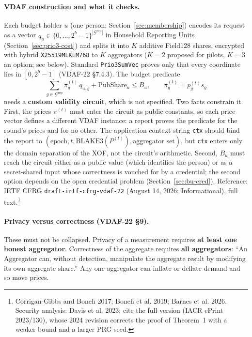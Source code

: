 \documentclass[10pt,twoside,openany]{book}
\theoremstyle{dpepstyle}
\begin{document}
\paragraph{VDAF construction and what it checks.}
Each budget holder $u$ (one person; Section~\ref{sec:membership}) encodes its request as a vector $q_u \in \{0,\dots,2^{b}-1\}^{|\mathcal{G}^{\text{rep}}|}$ in Household Reporting Units (Section~\ref{sec:prio3-cost}) and splits it into $K$ additive Field128 shares, encrypted with hybrid \texttt{X25519MLKEM768} to $K$ aggregators ($K=2$ proposed for pilots, $K=3$ an option; see below). Standard \texttt{Prio3SumVec} proves only that every coordinate lies in $[0, 2^b-1]$ (VDAF-22 \S 7.4.3). The budget predicate
\begin{equation}
  \sum_{g \in \mathcal{G}^{\text{rep}}} \pi_g^{(t)}\, q_{u,g} + \text{PubShare}_u \le B_u, \qquad \pi_g^{(t)} = p_g^{(t)} s_g \label{eq:budget-circuit}
\end{equation}
needs a \textbf{custom validity circuit}, which is not specified. Two facts constrain it. First, the prices $\pi^{(t)}$ must enter the circuit as public constants, so each price vector defines a different VDAF instance: a report proves the predicate for the round's prices and for no other. The application context string \texttt{ctx} should bind the report to $(\text{epoch}, t, \text{BLAKE3}(P^{(t)}), \text{aggregator set})$, but \texttt{ctx} enters only the domain separation of the XOF, not the circuit's arithmetic. Second, $B_u$ must reach the circuit either as a public value (which identifies the person) or as a secret-shared input whose correctness is vouched for by a credential; the second option depends on the open credential problem (Section~\ref{sec:bu-cred}). Reference: IETF CFRG \texttt{draft-irtf-cfrg-vdaf-22} (August 14, 2026; Informational), full text.\footnote{Corrigan-Gibbs and Boneh 2017; Boneh et al. 2019; Barnes et al. 2026. Security analysis: Davis et al. 2023; cite the full version (IACR ePrint 2023/130), whose 2024 revision corrects the proof of Theorem~1 with a weaker bound and a larger PRG seed.}

\paragraph{Privacy versus correctness (VDAF-22 \S 9).}
These must not be collapsed. Privacy of a measurement requires \textbf{at least one honest aggregator}. Correctness of the aggregate requires \textbf{all aggregators}: ``An Aggregator can, without detection, manipulate the aggregate result by modifying its own aggregate share.'' Any one aggregator can inflate or deflate demand and so move prices.
\end{document}
